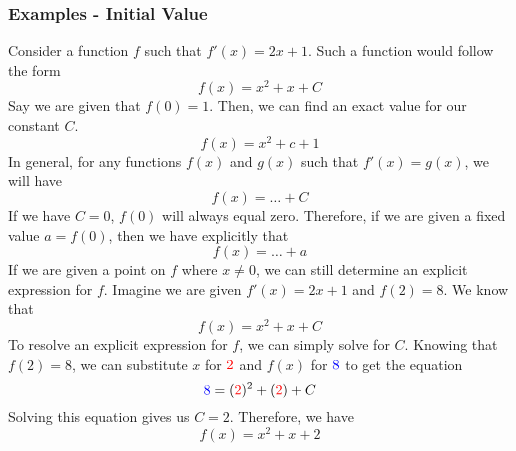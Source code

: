 \documentclass[10pt]{article}
\begin{document}
\subsubsection{Examples - Initial Value}
Consider a function $f$ such that $f'(x)=2x+1$. Such a function would follow the form
$$
    f(x)=x^2+x+C
$$
Say we are given that $f(0)=1$. Then, we can find an exact value for our constant $C$.
$$
    f(x)=x^2+c+1
$$
In general, for any functions $f(x)$ and $g(x)$ such that $f'(x)=g(x)$, we will have
$$
    f(x)=\dots+C
$$
If we have $C=0$, $f(0)$ will always equal zero. Therefore, if we are given a fixed value $a=f(0)$, then we have explicitly that
$$
    f(x)=\dots+a
$$
If we are given a point on $f$ where $x\neq 0$, we can still determine an explicit expression for $f$. Imagine we are given $f'(x)=2x+1$ and $f(2)=8$. We know that
$$
    f(x)=x^2+x+C
$$
To resolve an explicit expression for $f$, we can simply solve for $C$. Knowing that $f(2)=8$, we can substitute $x$ for $\textcolor{red}{2}$ and $f(x)$ for $\textcolor{blue}{8}$ to get the equation
$$
    \textcolor{blue}{8}=(\textcolor{red}{2})^2+(\textcolor{red}{2})+C
$$
Solving this equation gives us $C=2$. Therefore, we have
$$
    f(x)=x^2+x+2
$$
\end{document}
